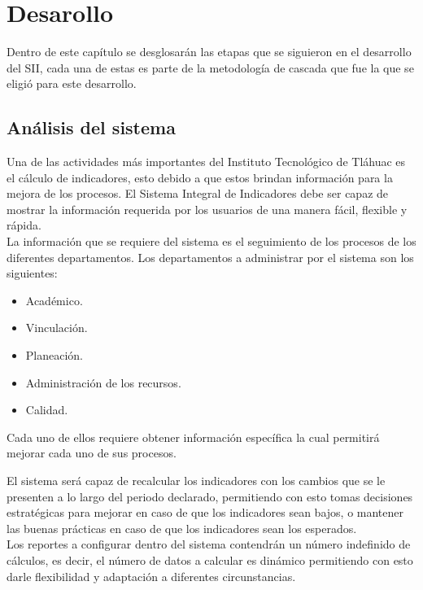 \chapter{Desarollo}

	Dentro de este cap\'itulo se desglosar\'an las etapas que se siguieron en el desarrollo del SII, cada una de estas es parte de la metodolog\'ia de cascada que fue la que se eligi\'o para este desarrollo.

	\section{An\'alisis del sistema}
		Una de las actividades m\'as importantes del Instituto Tecnol\'ogico de Tl\'ahuac es el c\'alculo de indicadores, esto debido a que estos brindan informaci\'on para la mejora de los procesos. El Sistema Integral de Indicadores debe ser capaz de mostrar la informaci\'on requerida por los usuarios de una manera f\'acil, flexible y r\'apida.\\

		La informaci\'on que se requiere del sistema es el seguimiento de los procesos de los diferentes departamentos. Los departamentos a administrar por el sistema son los siguientes:

		\begin{itemize}
			\item Acad\'emico.
			\item Vinculaci\'on.
			\item Planeaci\'on.
			\item Administraci\'on de los recursos.
			\item Calidad.
		\end{itemize}

		Cada uno de ellos requiere obtener informaci\'on espec\'ifica la cual permitir\'a mejorar cada uno de sus procesos.

		El sistema ser\'a capaz de recalcular los indicadores con los cambios que se le presenten a lo largo del periodo declarado, permitiendo con esto tomas decisiones estrat\'egicas para mejorar en caso de que los indicadores sean bajos, o mantener las buenas pr\'acticas en caso de que los indicadores sean los esperados.\\

		Los reportes a configurar dentro del sistema contendr\'an un n\'umero indefinido de c\'alculos, es decir, el n\'umero de datos a calcular es din\'amico permitiendo con esto darle flexibilidad y adaptaci\'on a diferentes circunstancias.\\


